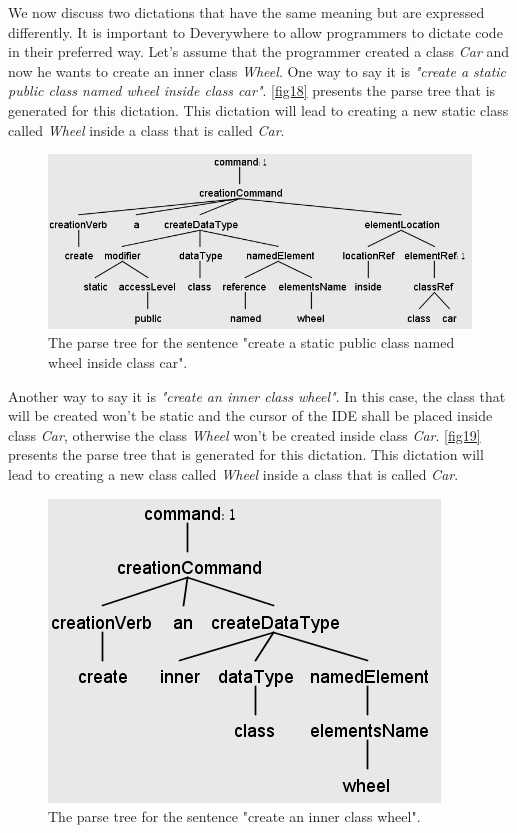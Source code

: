 We now discuss two dictations that have the same meaning but are expressed differently. It is important to Deverywhere to allow programmers to dictate code in their preferred way. Let’s assume that the programmer created a class \textit{Car} and now he wants to create an inner class \textit{Wheel}. One way to say it is \textit{"create a static public class named wheel inside class car"}. \autoref{fig18} presents the parse tree that is generated for this dictation. This dictation will lead to creating a new static class called \textit{Wheel} inside a class that is called \textit{Car}.   

\begin{figure}[H]
	\centering
	\includegraphics[scale=0.4]{"./fig/Parse Tree create a static public class named wheel inside class car"}
	\caption{The parse tree for the sentence "create a static public class named wheel inside class car".}
	\label{fig18}
\end{figure}

Another way to say it is \textit{"create an inner class wheel"}. In this case, the class that will be created won't be static and the cursor of the IDE shall be placed inside class \textit{Car}, otherwise the class \textit{Wheel} won't be created inside class \textit{Car}. \autoref{fig19} presents the parse tree that is generated for this dictation. This dictation will lead to creating a new class called \textit{Wheel} inside a class that is called \textit{Car}.

\begin{figure}[H]
	\centering
	\includegraphics[scale=0.4]{"./fig/Parse Tree create an inner class wheel"}
	\caption{The parse tree for the sentence "create an inner class wheel".}
	\label{fig19}
\end{figure}

